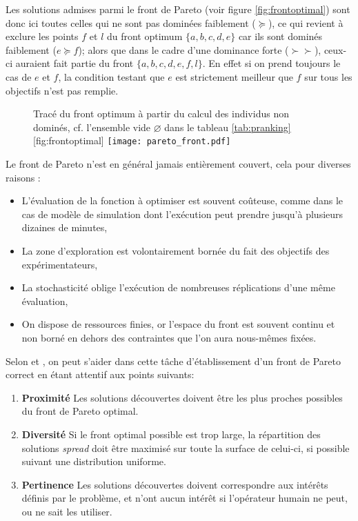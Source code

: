 Les solutions admises parmi le front de Pareto (voir figure \ref{fig:frontoptimal}) sont donc ici toutes celles qui ne sont pas dominées faiblement ($\succeq$), ce qui revient à exclure les points $f$ et $l$ du front optimum $\{a,b,c,d,e\}$ car ils sont dominés faiblement ($e \succeq f$); alors que dans le cadre d'une dominance forte ($\succ \succ$), ceux-ci auraient fait partie du front $\{a,b,c,d,e,f,l\}$. En effet si on prend toujours le cas de $e$ et $f$, la condition testant que $e$ est strictement meilleur que $f$ sur tous les objectifs n'est pas remplie. %

\begin{figure}[!htb]
	\begin{sidecaption}[fortoc]{Tracé du front optimum à partir du calcul des individus non dominés, cf. l'ensemble vide $\varnothing$ dans le tableau \ref{tab:pranking}}[fig:frontoptimal]
		\centering
		\texttt{[image: pareto\_front.pdf]}{
		}
  \end{sidecaption}
\end{figure}

Le front de Pareto n'est en général jamais entièrement couvert, cela pour diverses raisons : 

\begin{itemize}
\item L'évaluation de la fonction à optimiser est souvent coûteuse, comme dans le cas de modèle de simulation dont l'exécution peut prendre jusqu'à plusieurs dizaines de minutes, 
\item La zone d'exploration est volontairement bornée du fait des objectifs des expérimentateurs, 
\item La stochasticité oblige l'exécution de nombreuses réplications d'une même évaluation,
\item On dispose de ressources finies, or l'espace du front est souvent continu et non borné en dehors des contraintes que l'on aura nous-mêmes fixées.
\end{itemize}

Selon \textcite[70]{Weise2011} et \autocite[19]{Zitzler1999a}, on peut s'aider dans cette tâche d'établissement d'un front de Pareto correct en étant attentif aux points suivants:

\begin{enumerate}
\item{\textbf{Proximité}} Les solutions découvertes doivent être les plus proches possibles du front de Pareto optimal.
\item{\textbf{Diversité}} Si le front optimal possible est trop large, la répartition des solutions \textit{spread} doit être maximisé sur toute la surface de celui-ci, si possible suivant une distribution uniforme.
\item{\textbf{Pertinence}} Les solutions découvertes doivent correspondre aux intérêts définis par le problème, et n'ont aucun intérêt si l'opérateur humain ne peut, ou ne sait les utiliser.
\end{enumerate}

